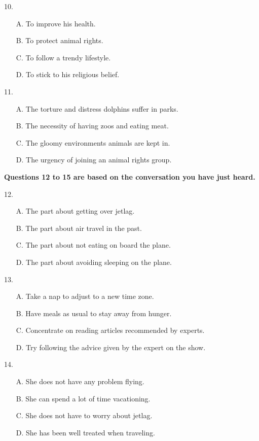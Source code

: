 \documentclass[UTF8,11pt]{ctexart}
\begin{document}
10.


\begin{itemize}[leftmargin=2em,itemsep=.2em,topsep=.4em]\item[A.] To improve his health.
\item[B.] To protect animal rights.
\item[C.] To follow a trendy lifestyle.
\item[D.] To stick to his religious belief.
\end{itemize}

11.


\begin{itemize}[leftmargin=2em,itemsep=.2em,topsep=.4em]\item[A.] The torture and distress dolphins suffer in parks.
\item[B.] The necessity of having zoos and eating meat.
\item[C.] The gloomy environments animals are kept in.
\item[D.] The urgency of joining an animal rights group.
\end{itemize}

\textbf{Questions 12 to 15 are based on the conversation you have just heard.}


12.


\begin{itemize}[leftmargin=2em,itemsep=.2em,topsep=.4em]\item[A.] The part about getting over jetlag.
\item[B.] The part about air travel in the past.
\item[C.] The part about not eating on board the plane.
\item[D.] The part about avoiding sleeping on the plane.
\end{itemize}

13.


\begin{itemize}[leftmargin=2em,itemsep=.2em,topsep=.4em]\item[A.] Take a nap to adjust to a new time zone.
\item[B.] Have meals as usual to stay away from hunger.
\item[C.] Concentrate on reading articles recommended by experts.
\item[D.] Try following the advice given by the expert on the show.
\end{itemize}

14.


\begin{itemize}[leftmargin=2em,itemsep=.2em,topsep=.4em]\item[A.] She does not have any problem flying.
\item[B.] She can spend a lot of time vacationing.
\item[C.] She does not have to worry about jetlag.
\item[D.] She has been well treated when traveling.
\end{itemize}
\end{document}
